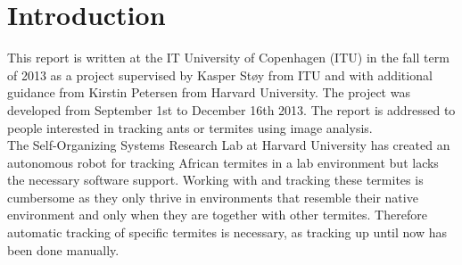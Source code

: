 
\section{Introduction}

% 
% 

This report is written at the IT University of Copenhagen (ITU) in the fall term of 2013 as a project supervised by Kasper Støy from ITU and with additional guidance from Kirstin Petersen from Harvard University. The project was developed from September 1st to December 16th 2013. The report is addressed to people interested in tracking ants or termites using image analysis. \\

The Self-Organizing Systems Research Lab at Harvard University has created an autonomous robot for tracking African termites in a lab environment but lacks the necessary software support. Working with and tracking these termites is cumbersome as they only thrive in environments that resemble their native environment and only when they are together with other termites. Therefore automatic tracking of specific termites is necessary, as tracking up until now has been done manually. \\

